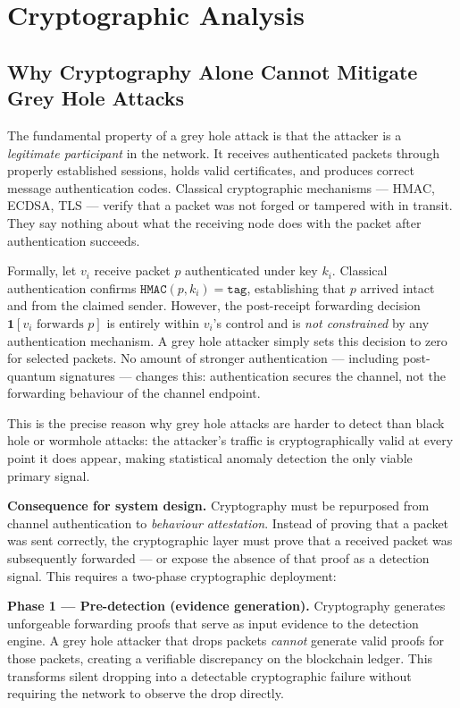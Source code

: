 \documentclass[12pt, a4paper]{report}
\newcommand{\mypar}{\vspace{0.8em}\noindent}
\begin{document}
\section{Cryptographic Analysis}
\label{sec:crypto_analysis}

\subsection{Why Cryptography Alone Cannot Mitigate Grey Hole Attacks}

The fundamental property of a grey hole attack is that the attacker is a
\emph{legitimate participant} in the network. It receives authenticated packets
through properly established sessions, holds valid certificates, and produces
correct message authentication codes. Classical cryptographic mechanisms --- HMAC,
ECDSA, TLS --- verify that a packet was not forged or tampered with in transit.
They say nothing about what the receiving node does with the packet after
authentication succeeds.

Formally, let $v_i$ receive packet $p$ authenticated under key $k_i$. Classical
authentication confirms $\texttt{HMAC}(p, k_i) = \texttt{tag}$, establishing
that $p$ arrived intact and from the claimed sender. However, the post-receipt
forwarding decision $\mathbf{1}[v_i \text{ forwards } p]$ is entirely within
$v_i$'s control and is \emph{not constrained} by any authentication mechanism.
A grey hole attacker simply sets this decision to zero for selected packets.
No amount of stronger authentication --- including post-quantum signatures --- changes
this: authentication secures the channel, not the forwarding behaviour of
the channel endpoint.

This is the precise reason why grey hole attacks are harder to detect than
black hole or wormhole attacks: the attacker's traffic is cryptographically
valid at every point it does appear, making statistical anomaly detection the
only viable primary signal.

\mypar
\textbf{Consequence for system design.} Cryptography must be repurposed from
channel authentication to \emph{behaviour attestation}. Instead of proving
that a packet was sent correctly, the cryptographic layer must prove that a
received packet was subsequently forwarded --- or expose the absence of that proof
as a detection signal. This requires a two-phase cryptographic deployment:

\textbf{Phase 1 --- Pre-detection (evidence generation).}
Cryptography generates unforgeable forwarding proofs that serve as input evidence to the detection engine. A grey hole attacker that drops packets \emph{cannot} generate valid proofs for those packets, creating a verifiable discrepancy on the blockchain ledger. This transforms silent dropping into a detectable cryptographic failure without requiring the network to observe the drop directly.
\end{document}
